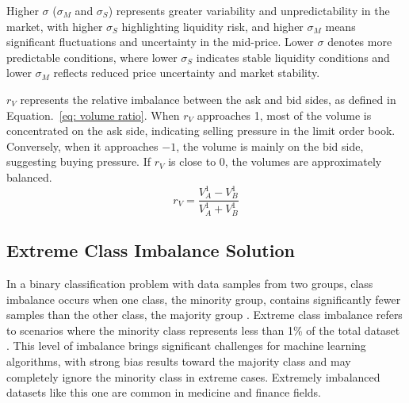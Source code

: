 Higher $\sigma$ ($\sigma_M$ and $\sigma_S$) represents greater variability and unpredictability in the market, with higher $\sigma_{S}$ highlighting liquidity risk, and higher $\sigma_{M}$ means significant fluctuations and uncertainty in the mid-price. Lower $\sigma$ denotes more predictable conditions, where lower $\sigma_{S}$ indicates stable liquidity conditions and lower $\sigma_{M}$ reflects reduced price uncertainty and market stability.

$r_V$ represents the relative imbalance between the ask and bid sides, as defined in Equation.~\ref{eq: volume ratio}. When $r_V$ approaches 1, most of the volume is concentrated on the ask side, indicating selling pressure in the limit order book. Conversely, when it approaches $-1$, the volume is mainly on the bid side, suggesting buying pressure. If $r_V$ is close to 0, the volumes are approximately balanced.
\begin{equation}
    r_V = \frac{V_A ^ {1} - V_B ^ {1}}{V_A ^ {1} + V_B ^ {1}}
    \label{eq: volume ratio}
\end{equation}


\subsection{Extreme Class Imbalance Solution} \label{sec: class imbalance}
In a binary classification problem with data samples from two groups, class imbalance occurs when one class, the minority group, contains significantly fewer samples than the other class, the majority group \citep{johnson_survey_2019}. Extreme class imbalance refers to scenarios where the minority class represents less than 1\% of the total dataset \citep{leevy_survey_2018}. This level of imbalance brings significant challenges for machine learning algorithms, with strong bias results toward the majority class and may completely ignore the minority class in extreme cases. Extremely imbalanced datasets like this one are common in medicine and finance fields.

